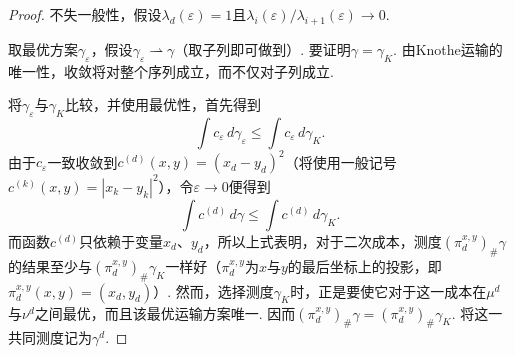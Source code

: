 \begin{proof}
不失一般性，假设$\lambda_d(\varepsilon)=1$且$\lambda_i(\varepsilon)/\lambda_{i+1}(\varepsilon)\to0$.

取最优方案$\gamma_\varepsilon$，假设$\gamma_\varepsilon\rightharpoonup\gamma$（取子列即可做到）. 要证明$\gamma=\gamma_K$. 由Knothe运输的唯一性，收敛将对整个序列成立，而不仅对子列成立.

将$\gamma_\varepsilon$与$\gamma_K$比较，并使用最优性，首先得到
\begin{equation}\label{eq:2.5}
\int c_\varepsilon\,d\gamma_\varepsilon\le\int c_\varepsilon\,d\gamma_K.
\end{equation}
由于$c_\varepsilon$一致收敛到$c^{(d)}(x,y)=(x_d-y_d)^2$（将使用一般记号$c^{(k)}(x,y)=|x_k-y_k|^2$），令$\varepsilon\to0$便得到
\[
\int c^{(d)}\,d\gamma\le\int c^{(d)}\,d\gamma_K.
\]
而函数$c^{(d)}$只依赖于变量$x_d$、$y_d$，所以上式表明，对于二次成本，测度$(\pi_d^{x,y})_\#\gamma$的结果至少与$(\pi_d^{x,y})_\#\gamma_K$一样好（$\pi_d^{x,y}$为$x$与$y$的最后坐标上的投影，即$\pi_d^{x,y}(x,y)=(x_d,y_d)$）. 然而，选择测度$\gamma_K$时，正是要使它对于这一成本在$\mu^d$与$\nu^d$之间最优，而且该最优运输方案唯一. 因而$(\pi_d^{x,y})_\#\gamma=(\pi_d^{x,y})_\#\gamma_K$. 将这一共同测度记为$\gamma^d$.


\end{proof}
